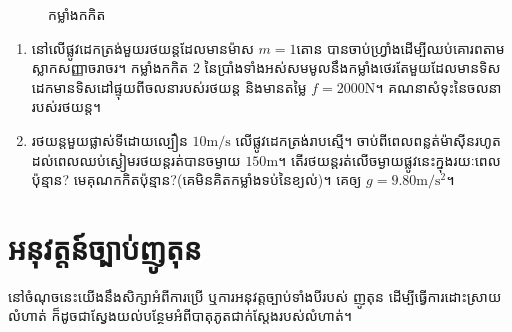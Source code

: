 \begin{figure}[H]
	\centering
	\caption{កម្លាំងកកិត}
\end{figure}
\begin{exercise}
	\begin{enumerate}
		\item នៅលើផ្លូវដេកត្រង់មួយរថយន្តដែលមានម៉ាស $m=1$តោន បានចាប់ហ្រ្វាំងដើម្បីឈប់គោរពតាមស្លាកសញ្ញាចរាចរ។ កម្លាំងកកិត $2$ នៃប្រាំងទាំងអស់សមមូលនឹងកម្លាំងថេរតែមួយដែលមានទិសដេកមានទិសដៅផ្ទុយពីចលនារបស់រថយន្ត និងមានតម្លៃ $f=2000\si{\newton}$។ គណនាសំទុះនៃចលនារបស់រថយន្ត។
		\begin{figure}[H]
			\centering
		\end{figure}
		\item រថយន្តមួយផ្លាស់ទីដោយល្បឿន $10\si{\metre/\second}$ លើផ្លូវដេកត្រង់រាបស្មើ។ ចាប់ពីពេលពន្លត់ម៉ាស៊ីនរហូតដល់ពេលឈប់ស្ងៀមរថយន្តរត់បានចម្ងាយ $150\si{\metre}$។ តើរថយន្តរត់លើចម្ងាយផ្លូវនេះក្នុងរយៈពេលប៉ុន្មាន? មេគុណកកិតប៉ុន្មាន?(គេមិនគិតកម្លាំងទប់នៃខ្យល់)។ គេឲ្យ $g=9.80\si{\metre/\second^{2}}$។
	\end{enumerate}
\end{exercise}
\section{អនុវត្តន៍ច្បាប់ញូតុន}
\quad នៅចំណុចនេះយើងនឹងសិក្សាអំពីការប្រើ ឬការអនុវត្តច្បាប់ទាំងបីរបស់ ញូតុន ដើម្បីធ្វើការដោះស្រាយលំហាត់ ក៏ដូចជាស្វែងយល់បន្ថែមអំពីបាតុភូតជាក់ស្តែងរបស់លំហាត់។
